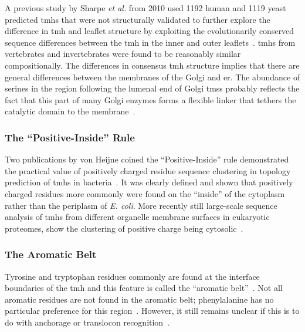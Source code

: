 A previous study by Sharpe \textit{ et al.} from 2010 used 1192 human and 1119 yeast predicted \gls{tmh}s that were not structurally validated to further explore the difference in \gls{tmh} and leaflet structure by exploiting the evolutionarily conserved sequence differences between the \gls{tmh} in the inner and outer leaflets~\cite{Sharpe2010}.
\gls{tmh}s from vertebrates and invertebrates were found to be reasonably similar compositionally.
The differences in consensus \gls{tmh} structure implies that there are general differences between the membranes of the Golgi and \gls{er}.
The abundance of serines in the region following the lumenal end of Golgi \gls{tms}s probably reflects the fact that this part of many Golgi enzymes forms a flexible linker that tethers the catalytic domain to the membrane~\cite{Sharpe2010}.

\subsubsection{The ``Positive-Inside'' Rule}

Two publications by von Heijne coined the ``Positive-Inside'' rule demonstrated the practical value of positively charged residue sequence clustering in topology prediction of \gls{tmh}s in bacteria~\cite{VonHeijne1989,Andersson1992}.
It was clearly defined and shown that positively charged residues more commonly were found on the ``inside'' of the cytoplasm rather than the periplasm of \textit{ E.
coli}.
More recently still large-scale sequence analysis of \gls{tmh}s from different organelle membrane surfaces in eukaryotic proteomes, show the clustering of positive charge being cytosolic~\cite{Sharpe2010, Baeza-Delgado2013, Pogozheva2013}.

\subsubsection{The Aromatic Belt}

 Tyrosine and tryptophan residues commonly are found at the interface boundaries of the \gls{tmh} and this feature is called the ``aromatic belt''~\cite{Hessa2005, Granseth2005, Sharpe2010, Baeza-Delgado2013, Nilsson2005a}.
Not all aromatic residues are not found in the aromatic belt; phenylalanine has no particular preference for this region~\cite{Granseth2005, Braun1999}.
However, it still remains unclear if this is to do with anchorage or translocon recognition~\cite{Baeza-Delgado2013}.

